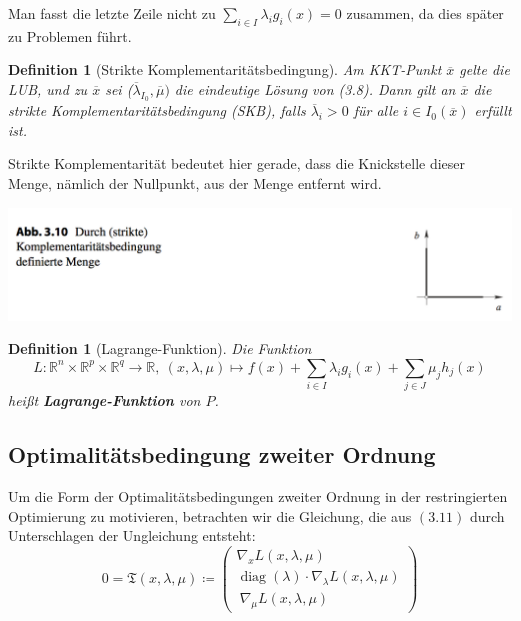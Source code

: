 \documentclass[11pt]{scrreprt}
\newcounter{thm}
\theoremstyle{thmstyle}
\numberwithin{thm}{section}
\newtheorem{definition}[thm]{Definition}
\begin{document}
Man fasst die letzte Zeile nicht zu $\sum_{i \in I} \lambda_i g_i(x) = 0$ zusammen, da dies später zu Problemen führt.

\begin{definition}[Strikte Komplementaritätsbedingung]
	Am KKT-Punkt $\overline{x}$ gelte die LUB, und zu $\overline{x}$ sei ($\overline{\lambda}_{I_0}, \overline{\mu})$ die eindeutige Lösung von (3.8). Dann gilt an $\overline{x}$ die strikte Komplementaritätsbedingung (SKB), falls $\overline{\lambda}_i > 0$ für alle $i \in I_0(\overline{x})$ erfüllt ist.
\end{definition}
 
Strikte Komplementarität bedeutet hier gerade, dass die Knickstelle dieser Menge, nämlich der Nullpunkt, aus der Menge entfernt wird.

\begin{center}
	\includegraphics[scale=0.5]{ab310}
\end{center}

\setcounter{thm}{51}
 
\begin{definition}[Lagrange-Funktion]
	Die Funktion
	$$ L \colon \mathbb{R}^n \times \mathbb{R}^p \times \mathbb{R}^q \rightarrow \mathbb{R}, ~ (x, \lambda, \mu) \mapsto f(x) + \sum_{i \in I} \lambda_i g_i(x) + \sum_{j \in J} \mu_j h_j(x) $$
	heißt \textbf{Lagrange-Funktion} von $P$.
\end{definition} 

\subsection*{Optimalitätsbedingung zweiter Ordnung}

Um die Form der Optimalitätsbedingungen zweiter Ordnung in der restringierten Optimierung zu motivieren, betrachten wir die Gleichung, die aus $(3.11)$ durch Unterschlagen der Ungleichung entsteht:
$$ 0 = \mathfrak{T}(x, \lambda, \mu) \coloneqq \begin{pmatrix}
	\nabla_x L(x, \lambda, \mu) \\ \operatorname{diag}(\lambda) \cdot \nabla_\lambda L(x, \lambda, \mu) \\\
	\nabla_\mu L(x, \lambda, \mu)
\end{pmatrix} $$
\end{document}
